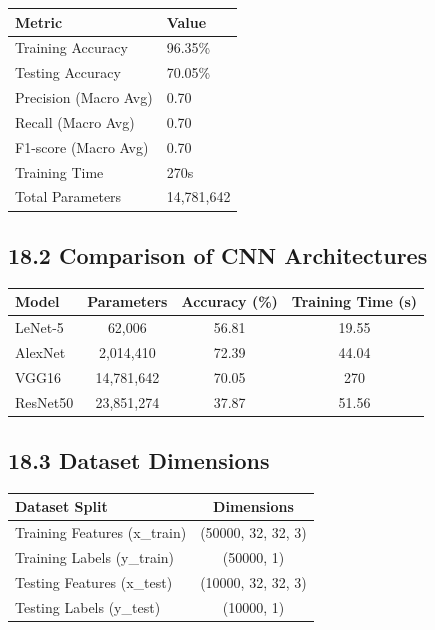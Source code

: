 \documentclass[11pt]{article}
\renewcommand{\arraystretch}{1.3}
\begin{document}
\begin{center}
\renewcommand{\arraystretch}{1.3}
\begin{tabular}{|p{5cm}|p{4cm}|}
\hline
\textbf{Metric} & \textbf{Value} \\
\hline
Training Accuracy & 96.35\% \\
\hline
Testing Accuracy & 70.05\% \\
\hline
Precision (Macro Avg) & 0.70 \\
\hline
Recall (Macro Avg) & 0.70 \\
\hline
F1-score (Macro Avg) & 0.70 \\
\hline
Training Time & 270s \\
\hline
Total Parameters & 14,781,642 \\
\hline
\end{tabular}
\end{center}

\vspace{5mm}
\subsection*{18.2 Comparison of CNN Architectures}

\begin{center}
\renewcommand{\arraystretch}{1.3}
\begin{tabular}{|l|c|c|c|}
\hline
\textbf{Model} & \textbf{Parameters} & \textbf{Accuracy (\%)} & \textbf{Training Time (s)} \\
\hline
LeNet-5 & 62,006 & 56.81 & 19.55 \\
\hline
AlexNet & 2,014,410 & 72.39 & 44.04 \\
\hline
VGG16 & 14,781,642 & 70.05 & 270 \\
\hline
ResNet50 & 23,851,274 & 37.87 & 51.56 \\
\hline
\end{tabular}
\end{center}

\vspace{5mm}
\subsection*{18.3 Dataset Dimensions}

\begin{center}
\renewcommand{\arraystretch}{1.3}
\begin{tabular}{|l|c|}
\hline
\textbf{Dataset Split} & \textbf{Dimensions} \\
\hline
Training Features (x\_train) & (50000, 32, 32, 3) \\
\hline
Training Labels (y\_train) & (50000, 1) \\
\hline
Testing Features (x\_test) & (10000, 32, 32, 3) \\
\hline
Testing Labels (y\_test) & (10000, 1) \\
\hline
\end{tabular}
\end{center}
\end{document}
